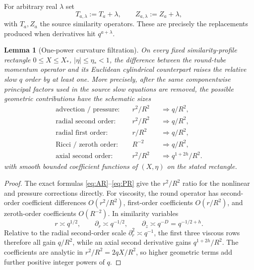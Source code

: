 \documentclass[aps,prd,reprint,superscriptaddress,nofootinbib,floatfix]{revtex4-2}
\newtheorem{lemma}[theorem]{Lemma}
\theoremstyle{definition}
\theoremstyle{remark}
\begin{document}
For arbitrary real $\lambda$ set
\begin{equation}
	T_{a,\lambda}:=T_a+\lambda,\qquad
	Z_{a,\lambda}:=Z_a+\lambda,
	\label{eq:genericTZ}
\end{equation}
with $T_a,Z_a$ the source similarity operators. These are precisely the replacements produced when derivatives hit $q^{a+\lambda}$.

\begin{lemma}[One-power curvature filtration]\label{lem:curvfilter}
	On every fixed similarity-profile rectangle $0\le X\le X_*$, $|\eta|\le\eta_*<1$, the difference between the round-tube momentum operator and its Euclidean cylindrical counterpart raises the relative slow $q$ order by at least one. More precisely, after the same componentwise principal factors used in the source slow equations are removed, the possible geometric contributions have the schematic sizes
	\begin{align*}
		\text{advection / pressure:}\quad & r^2/R^2 &  & \Longrightarrow q/R^2,        \\
		\text{radial second order:}\quad  & r^2/R^2 &  & \Longrightarrow q/R^2,        \\
		\text{radial first order:}\quad   & r/R^2   &  & \Longrightarrow q/R^2,        \\
		\text{Ricci / zeroth order:}\quad & R^{-2}  &  & \Longrightarrow q/R^2,        \\
		\text{axial second order:}\quad   & r^2/R^2 &  & \Longrightarrow q^{1+2h}/R^2.
	\end{align*}
	with smooth bounded coefficient functions of $(X,\eta)$ on the stated rectangle.
\end{lemma}

\begin{proof}
	The exact formulas \eqref{eq:AR}--\eqref{eq:PR} give the $r^2/R^2$ ratio for the nonlinear and pressure corrections directly. For viscosity, the round operator has second-order coefficient differences $O(r^2/R^2)$, first-order coefficients $O(r/R^2)$, and zeroth-order coefficients $O(R^{-2})$. In similarity variables
	\begin{equation}
		r\asymp q^{1/2},\qquad \partial_r\asymp q^{-1/2},\qquad
		\partial_z\asymp q^{-D}=q^{-1/2+h}.
	\end{equation}
	Relative to the radial second-order scale $\partial_r^2\asymp q^{-1}$, the first three viscous rows therefore all gain $q/R^2$, while an axial second derivative gains $q^{1+2h}/R^2$. The coefficients are analytic in $r^2/R^2=2qX/R^2$, so higher geometric terms add further positive integer powers of $q$.
\end{proof}
\end{document}
